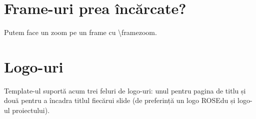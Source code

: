 \documentclass{beamer}
\begin{document}
\section{Frame-uri prea încărcate?}
\begin{frame}
Putem face un zoom pe un frame cu \textbackslash framezoom.
\end{frame}

\section{Logo-uri}
\begin{frame}
Template-ul suportă acum trei feluri de logo-uri: unul pentru pagina de titlu
și două pentru a încadra titlul fiecărui slide (de preferință un logo ROSEdu
și logo-ul proiectului).
\end{frame}
\end{document}
